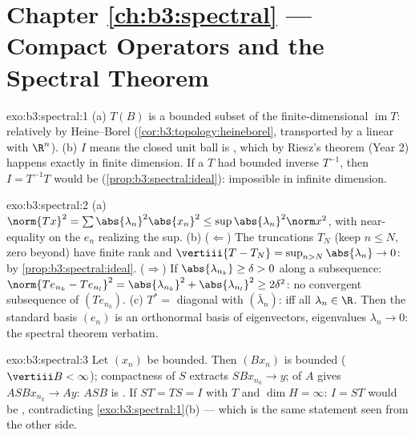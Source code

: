 \section*{Chapter \ref{ch:b3:spectral} --- Compact Operators
and the Spectral Theorem}

\begin{solution}{exo:b3:spectral:1}
(a) $T(B)$ is a bounded subset of the finite-dimensional
$\operatorname{im}T$: relatively  by Heine--Borel
(\cref{cor:b3:topology:heineborel}, transported by a linear
 with $\R^n$).
(b) $I$  means the closed unit ball is , which
by Riesz's theorem (Year 2) happens exactly in finite
dimension. If a  $T$ had bounded inverse $T^{-1}$, then
$I = T^{-1}T$ would be 
(\cref{prop:b3:spectral:ideal}): impossible in infinite
dimension.
\end{solution}

\begin{solution}{exo:b3:spectral:2}
(a) $\norm{Tx}^2 = \sum\abs{\lambda_n}^2\abs{x_n}^2 \leq
\sup\abs{\lambda_n}^2\norm x^2$, with near-equality on the
$e_n$ realizing the sup.
(b) ($\Leftarrow$) The truncations $T_N$ (keep $n \leq N$,
zero beyond) have finite rank and $\vertiii{T - T_N} =
\sup_{n>N}\abs{\lambda_n} \to 0$:  by
\cref{prop:b3:spectral:ideal}. ($\Rightarrow$) If
$\abs{\lambda_{n_k}} \geq \delta > 0$ along a subsequence:
$\norm{Te_{n_k} - Te_{n_l}}^2 = \abs{\lambda_{n_k}}^2 +
\abs{\lambda_{n_l}}^2 \geq 2\delta^2$: no convergent
subsequence of $(Te_{n_k})$.
(c) $T^* = $ diagonal with $(\bar\lambda_n)$:  iff
all $\lambda_n \in \R$. Then the standard basis $(e_n)$ is an
orthonormal basis of eigenvectors, eigenvalues $\lambda_n \to
0$: the spectral theorem verbatim.
\end{solution}

\begin{solution}{exo:b3:spectral:3}
Let $(x_n)$ be bounded. Then $(Bx_n)$ is bounded
($\vertiii B < \infty$); compactness of $S$ extracts
$SBx_{n_k} \to y$;  of $A$ gives $ASBx_{n_k} \to
Ay$: $ASB$ is . If $ST = TS = I$ with $T$  and
$\dim H = \infty$: $I = ST$ would be , contradicting
\cref{exo:b3:spectral:1}(b) --- which is the same statement
seen from the other side.
\end{solution}

